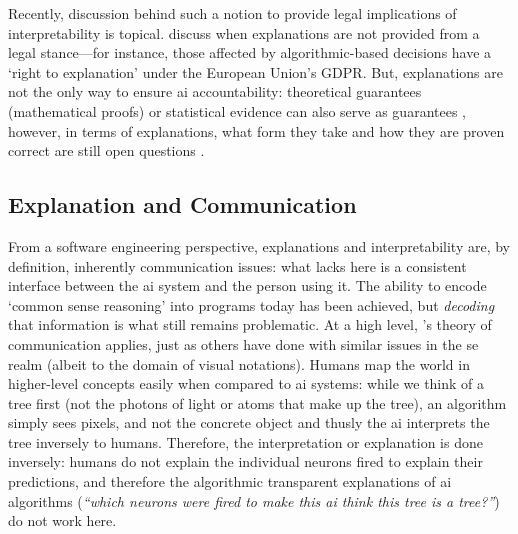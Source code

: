 Recently, discussion behind such a notion to provide legal implications of interpretability is topical. \citet{DoshiVelez:2017vm} discuss when explanations are not provided from a legal stance---for instance, those affected by algorithmic-based decisions have a `right to explanation' \citep{Goodman:2016wf,Wachter:2017hx} under the European Union's GDPR. But, explanations are not the only way to ensure \gls{ai} accountability: theoretical guarantees (mathematical proofs) or statistical evidence can also serve as guarantees \citep{DoshiVelez:2017vm}, however, in terms of explanations, what form they take and how they are proven correct are still open questions \citep{Lipton:2016if}.

\subsection{Explanation and Communication}
\label{ssec:background:probabilistic-stochastic:communication}

From a software engineering perspective, explanations and interpretability are, by definition, inherently communication issues: what lacks here is a consistent interface between the \gls{ai} system and the person using it. The ability to encode `common sense reasoning' \citep{McCarthy:1960:PCS:889202} into programs today has been achieved, but \textit{decoding} that information is what still remains problematic. At a high level, \citeauthor{Shannon:1963ti}'s theory of communication \citep{Shannon:1963ti} applies, just as others have done with similar issues in the \gls{se} realm \citep{Moody:2009vo,Wickham:2010hy} (albeit to the domain of visual notations). Humans map the world in higher-level concepts easily when compared to \gls{ai} systems: while we think of a tree first (not the photons of light or atoms that make up the tree), an algorithm simply sees pixels, and not the concrete object \citep{DoshiVelez:2017vm} and thusly the \gls{ai} interprets the tree inversely to humans. Therefore, the interpretation or explanation is done inversely: humans do not explain the individual neurons fired to explain their predictions, and therefore the algorithmic transparent explanations of \gls{ai} algorithms (\textit{``which neurons were fired to make this \gls{ai} think this tree is a tree?''}) do not work here.

